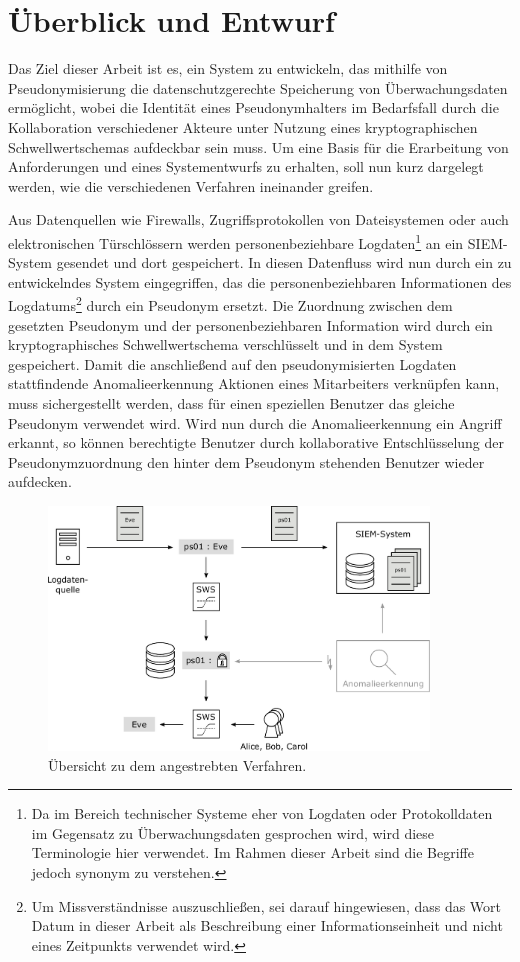 \chapter{Überblick und Entwurf}
\label{cha_overview}

Das Ziel dieser Arbeit ist es, ein System zu entwickeln, das mithilfe von Pseudonymisierung die datenschutzgerechte Speicherung von Überwachungsdaten ermöglicht, wobei die Identität eines Pseudonymhalters im Bedarfsfall durch die Kollaboration verschiedener Akteure unter Nutzung eines kryptographischen Schwellwertschemas aufdeckbar sein muss. Um eine Basis für die Erarbeitung von Anforderungen und eines Systementwurfs zu erhalten, soll nun kurz dargelegt werden, wie die verschiedenen Verfahren ineinander greifen. 

Aus Datenquellen wie Firewalls, Zugriffsprotokollen von Dateisystemen oder auch elektronischen Türschlössern werden personenbeziehbare Logdaten\footnote{
  Da im Bereich technischer Systeme eher von Logdaten oder Protokolldaten im Gegensatz zu Überwachungsdaten gesprochen wird, wird diese Terminologie hier verwendet. Im Rahmen dieser Arbeit sind die Begriffe jedoch synonym zu verstehen.
} an ein SIEM-System gesendet und dort gespeichert. In diesen Datenfluss wird nun durch ein zu entwickelndes System eingegriffen, das die personenbeziehbaren Informationen des Logdatums\footnote{
  Um Missverständnisse auszuschließen, sei darauf hingewiesen, dass das Wort Datum in dieser Arbeit als Beschreibung einer Informationseinheit und nicht eines Zeitpunkts verwendet wird. 
} durch ein Pseudonym ersetzt. Die Zuordnung zwischen dem gesetzten Pseudonym und der personenbeziehbaren Information wird durch ein kryptographisches Schwellwertschema verschlüsselt und in dem System gespeichert. Damit die anschließend auf den pseudonymisierten Logdaten stattfindende Anomalieerkennung Aktionen eines Mitarbeiters verknüpfen kann, muss sichergestellt werden, dass für einen speziellen Benutzer das gleiche Pseudonym verwendet wird. Wird nun durch die Anomalieerkennung ein Angriff erkannt, so können berechtigte Benutzer durch kollaborative Entschlüsselung der Pseudonymzuordnung den hinter dem Pseudonym stehenden Benutzer wieder aufdecken.

\begin{figure}[]
    \centering
        \includegraphics[width=0.9\textwidth]{dia/overview.pdf}
    \caption{Übersicht zu dem angestrebten Verfahren.}
    \label{fig:overview_initial}
\end{figure}

